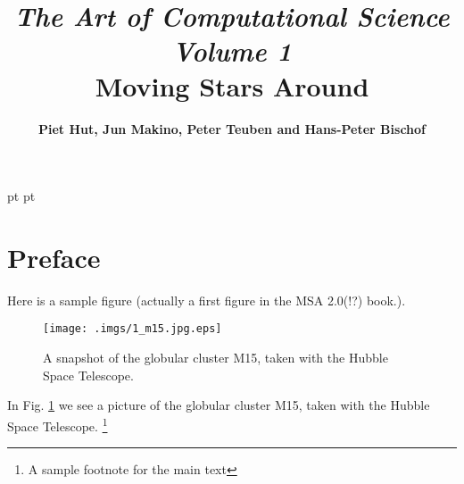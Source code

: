 \documentclass{book}
\begin{document}
 pt
 pt



\title{{\sl \huge The Art of Computational Science}\\
\bigskip
{\sl Volume 1}\\
\bigskip
\bigskip
\bigskip
\bigskip
\bigskip
\bf Moving Stars Around
\bigskip
}
\author{\bf Piet Hut, Jun Makino, Peter Teuben and Hans-Peter Bischof}


\maketitle
\thispagestyle{empty}


\newpage\tableofcontents\newpage


\chapter*{  Preface}
\label{sect:1}

Here is a sample figure (actually a first figure in the MSA 2.0(!?)
book.).

\begin{figure}
\begin{center}
    \texttt{[image: .imgs/1\_m15.jpg.eps]}
\caption{ A snapshot of the globular cluster M15, taken with the Hubble Space
 Telescope.
}
\label{m15}
\end{center}
\end{figure}


In Fig. \ref{m15} we see a
picture of the globular cluster M15, taken with the Hubble Space
Telescope. \footnote{A sample footnote for the main text}
\end{document}
